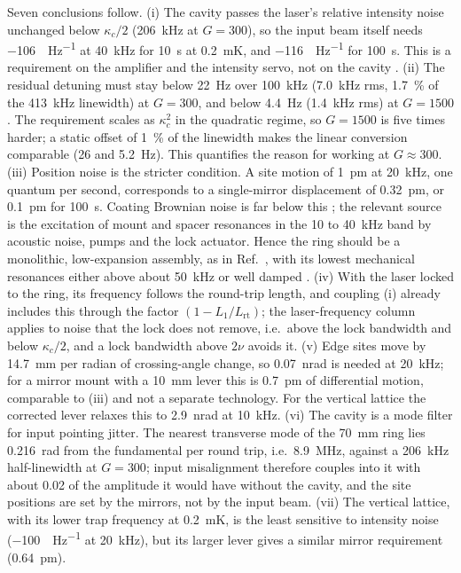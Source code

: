 \documentclass[11pt]{article}
\begin{document}
Seven conclusions follow. (i) The cavity passes the laser's relative intensity noise unchanged below
$\kappa_c/2$ (\SI{206}{\kilo\hertz} at $G = 300$), so the input beam itself needs \SI{-106}{\dBc\per\hertz}
at \SI{40}{\kilo\hertz} for \SI{10}{\second} at \SI{0.2}{\milli\kelvin}, and \SI{-116}{\dBc\per\hertz} for
\SI{100}{\second}. This is a requirement on the amplifier and the intensity servo, not on the cavity
. (ii) The residual
detuning must stay below \SI{22}{\hertz}\rtHz{} over \SI{100}{\kilo\hertz} (\SI{7.0}{\kilo\hertz} rms,
\SI{1.7}{\percent} of the \SI{413}{\kilo\hertz} linewidth) at $G = 300$, and below \SI{4.4}{\hertz}\rtHz{}
(\SI{1.4}{\kilo\hertz} rms) at $G = 1500$. The requirement scales as $\kappa_c^{2}$ in the quadratic
regime, so $G = 1500$ is five times harder; a static offset of \SI{1}{\percent} of the linewidth makes
the linear conversion comparable (26 and \SI{5.2}{\hertz}\rtHz). This quantifies the reason for working at
$G \approx 300$. (iii) Position noise is the stricter condition. A site motion of \SI{1}{\pico\metre}\rtHz{}
at \SI{20}{\kilo\hertz}, one quantum per second, corresponds to a single-mirror displacement of
\SI{0.32}{\pico\metre}\rtHz, or \SI{0.1}{\pico\metre}\rtHz{} for \SI{100}{\second}. Coating Brownian
noise is far below this ; the relevant
source is the excitation of mount and spacer resonances in the 10 to \SI{40}{\kilo\hertz} band by
acoustic noise, pumps and the lock actuator. Hence the ring should be a monolithic, low-expansion
assembly, as in Ref.~\cite{Park2022}, with its lowest mechanical resonances either above about
\SI{50}{\kilo\hertz} or well damped . (iv) With the laser
locked to the ring, its frequency follows the round-trip length, and coupling (i) already includes this
through the factor $(1 - L_1/L_\mathrm{rt})$; the laser-frequency column applies to noise that the lock
does not remove, i.e.\ above the lock bandwidth and below $\kappa_c/2$, and a lock bandwidth above $2\nu$
avoids it. (v) Edge sites move by \SI{14.7}{\milli\metre} per radian of crossing-angle change, so
\SI{0.07}{\nano\radian}\rtHz{} is needed at \SI{20}{\kilo\hertz}; for a mirror mount with a
\SI{10}{\milli\metre} lever this is \SI{0.7}{\pico\metre} of differential motion, comparable to (iii)
and not a separate technology. For the vertical lattice the corrected lever relaxes this to
\SI{2.9}{\nano\radian}\rtHz{} at \SI{10}{\kilo\hertz}. (vi) The cavity is a mode filter for input pointing jitter. The nearest
transverse mode of the \SI{70}{\milli\metre} ring lies \SI{0.216}{\radian} from the fundamental per round
trip, i.e.\ \SI{8.9}{\mega\hertz}, against a \SI{206}{\kilo\hertz} half-linewidth at $G = 300$; input
misalignment therefore couples into it with about 0.02 of the amplitude it would have without the
cavity, and the site positions are set by the mirrors, not by the input beam. (vii) The vertical
lattice, with its lower trap frequency at \SI{0.2}{\milli\kelvin}, is the least sensitive to intensity
noise (\SI{-100}{\dBc\per\hertz} at \SI{20}{\kilo\hertz}), but its larger lever gives a similar mirror
requirement (\SI{0.64}{\pico\metre}\rtHz).
\end{document}
